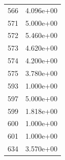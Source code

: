 \documentclass[12pt]{article}
\begin{document}
\begin{longtable}{@{}cc@{}}
566 & 4.096e+00 \\
571 & 5.000e+00 \\
572 & 5.460e+00 \\
573 & 4.620e+00 \\
574 & 4.200e+00 \\
575 & 3.780e+00 \\
593 & 1.000e+00 \\
597 & 5.000e+00 \\
599 & 1.818e+00 \\
600 & 1.000e+00 \\
601 & 1.000e+00 \\
634 & 3.570e+00 \\

\bottomrule
\end{longtable}
\end{document}
